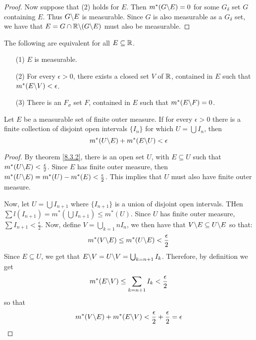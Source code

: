 \begin{proof}
    Now suppose that (2) holds for $E$. Then  $m^*(G \backslash E)=0$ for some
    $G_\delta$ set  $G$ containing $E$. Thus $G \backslash E$ is measurable. Since
    $G$ is also measurable as a  $G_\delta$ set, we have that  $E=G \cap
    \mathbb{R} \backslash (G \backslash E)$ must also be measurable.
\end{proof}
\begin{corollary}
    The following are equivalent for all $E \subseteq \mathbb{R}$.
    \begin{enumerate}
        \item[(1)] $E$ is measurable.

        \item[(2)] For every $\epsilon>0$, there exists a closed set $V$ of $\mathbb{R}$,
            contained in $E$ such that $m^*(E \backslash V)<\epsilon$.

        \item[(3)] There is an $F_\sigma$ set  $F$, contained in  $E$ such that
            $m^*(E \backslash F)=0$.
    \end{enumerate}
\end{corollary}

\begin{theorem}\label{8.3.3}
    Let $E$ be a measurable set of finite outer measure. If for every
    $\epsilon>0$ there is a finite collection of disjoint open intervals
    $\{I_n\}$ for which $U=\bigcup{I_n}$, then
    \begin{equation*}
        m^*(U \backslash E)+m^*(E \backslash U)<\epsilon
    \end{equation*}
\end{theorem}
\begin{proof}
    By theorem \ref{8.3.2}, there is an open set $U$, with  $E \subseteq U$ such
    that $m^*(U \backslash E)<\frac{\epsilon}{2}$. Since  $E$ has finite outer
    measure, then  $m^*(U \backslash E)=m^*(U)-m^*(E)<\frac{\epsilon}{2}$. This
    implies that $U$ must also have finite outer measure.

    Now, let $U=\bigcup{I_{n+1}}$ where $\{I_{n+1}\}$ is a union of disjoint
    open intervals. THen $\sum{l(I_{n+1})}=m^*(\bigcup{I_{n+1}}) \leq m^*(U)$.
    Since $U$ has finite outer measure,  $\sum{I_{n+1}}<\frac{\epsilon}{2}$.
    Now, define $V=\bigcup_{k=1}{n}{I_n}$, we then have that $V \backslash E
    \subseteq U \backslash E$ so that:
    \begin{equation*}
        m^*(V \backslash E) \leq m^*(U \backslash E)<\frac{\epsilon}{2}
    \end{equation*}
    Since $E \subseteq U$, we get that
    $E \backslash V=U \backslash V=\bigcup_{k=n+1}{I_k}$. Therefore, by definition we
    get
    \begin{equation*}
        m^*(E \backslash V) \leq \sum_{k=n+1}{I_k}<\frac{\epsilon}{2}
    \end{equation*}
    so that
    \begin{equation*}
        m^*(V \backslash E)+m^*(E \backslash V)<\frac{\epsilon}{2}+\frac{\epsilon}{2}=\epsilon
    \end{equation*}
\end{proof}
